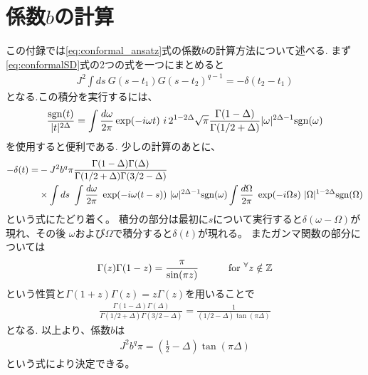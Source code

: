 \section{係数$b$の計算 \label{app:b}}
	
	この付録では\eqref{eq:conformal_ansatz}式の係数$b$の計算方法について述べる.
	まず\eqref{eq:conformalSD}式の2つの式を一つにまとめると
	\begin{align}
		J^2\int ds\ G(s - t_1)G(s - t_2)^{q - 1} = -\delta(t_2 - t_1)
		\label{eq:intOfGG}
	\end{align}
	となる.この積分を実行するには、
	\begin{align}
	\frac{\sgn(t)}{|t|^{2\Delta}} = 
		\int \frac{d\omega}{2\pi}\exp(-i\omega t)\ 
		i\, 2^{1 - 2\Delta}\sqrt{\pi}\frac{\Gamma(1 - \Delta)}{\Gamma(1/2 + \Delta)}
		|\omega|^{2\Delta - 1}\sgn(\omega)
	\end{align}
	を使用すると便利である.
	少しの計算のあとに、
	\begin{align}
	-\delta(t) = &-J^2b^q\pi
		\frac{\Gamma(1 - \Delta)\Gamma(\Delta)}{\Gamma(1/2 + \Delta)\Gamma(3/2 - \Delta)}
		\nonumber\\
		&\times \int ds\ 
		\int \frac{d\omega}{2\pi}\ \exp(-i\omega(t - s))\ |\omega|^{2\Delta - 1}\sgn(\omega)
		\int \frac{d\Omega}{2\pi}\ \exp(-i\Omega s)\ |\Omega|^{1 - 2\Delta}\sgn(\Omega)
	\end{align}
	という式にたどり着く。
	積分の部分は最初に$s$について実行すると$\delta(\omega - \Omega)$が現れ、その後
	$\omega$および$\Omega$で積分すると$\delta(t)$が現れる。
	またガンマ関数の部分については
	\begin{align}
	\Gamma(z)\Gamma(1 - z) = \frac{\pi}{\sin(\pi z)}
	\hspace{30pt}
	{\rm for}\ {}^{\forall}z \notin \mathbb{Z}
	\end{align}
	という性質と$\Gamma(1 + z)\Gamma(z) = z\Gamma(z)$を用いることで
	\begin{align}
	\frac{\Gamma(1 - \Delta)\Gamma(\Delta)}{\Gamma(1/2 + \Delta)\Gamma(3/2 - \Delta)}
	= \frac{1}{(1/2 - \Delta) \tan(\pi\Delta)}
	\end{align}
	となる. 以上より、係数$b$は
	\begin{align}
		J^2b^q\pi = \left(\frac{1}{2} - \Delta\right)\tan(\pi\Delta)
	\end{align}
	という式により決定できる。
	
	\pagebreak